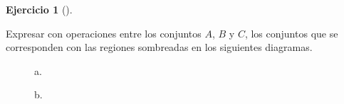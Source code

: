 \documentclass[
  a4paper,
]{scrreport}
\theoremstyle{definition}
\newtheorem{exercise}{Ejercicio}[chapter]
\theoremstyle{remark}
\begin{document}
\begin{exercise}[]\protect\hypertarget{exr-expresion-conjuntos}{}\label{exr-expresion-conjuntos}

Expresar con operaciones entre los conjuntos \(A\), \(B\) y \(C\), los
conjuntos que se corresponden con las regiones sombreadas en los
siguientes diagramas.

\begin{figure}

\begin{minipage}[t]{0.33\linewidth}

{\centering 


\caption{a.}

}

\end{minipage}%
%
\begin{minipage}[t]{0.33\linewidth}

{\centering 


\caption{b.}

}

\end{minipage}%
%
\begin{minipage}[t]{0.33\linewidth}


\end{minipage}
\end{figure}
\end{exercise}
\end{document}
